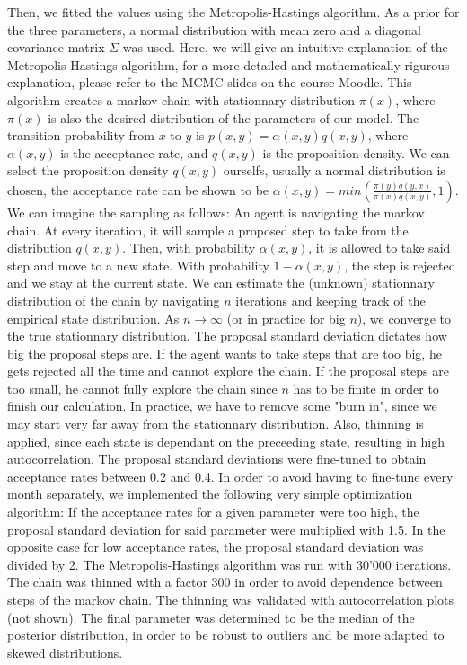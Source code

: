 \documentclass[10pt,conference,compsocconf]{IEEEtran}
\begin{document}
\par
Then, we fitted the values using the Metropolis-Hastings algorithm. As a prior for the three parameters, a normal distribution with mean zero and a diagonal covariance matrix $\Sigma$ was used.
Here, we will give an intuitive explanation of the Metropolis-Hastings algorithm, for a more detailed and mathematically rigurous explanation, please refer to the MCMC slides on the course Moodle.
This algorithm creates a markov chain with stationnary distribution $\pi(x)$, where $\pi(x)$ is also the desired distribution of the parameters of our model. The transition probability from $x$ to $y$ is $p(x,y)=\alpha(x,y) q(x,y)$, where $\alpha(x,y)$ is the acceptance rate, and $q(x,y)$ is the proposition density. We can select the proposition density $q(x,y)$ ourselfs, usually a normal distribution is chosen, the acceptance rate can be shown to be $\alpha(x,y)=min(\frac{\pi(y) q(y,x)}{\pi(x) q(x,y)},1)$.
We can imagine the sampling as follows:
An agent is navigating the markov chain. At every iteration, it will sample a proposed step to take from the distribution $q(x,y)$. Then, with probability $\alpha(x,y)$, it is allowed to take said step and move to a new state. With probability $1-\alpha(x,y)$, the step is rejected and we stay at the current state. We can estimate the (unknown) stationnary distribution of the chain by navigating $n$ iterations and keeping track of the empirical state distribution. As $n \to \infty$ (or in practice for big $n$), we converge to the true stationnary distribution. The proposal standard deviation dictates how big the proposal steps are. If the agent wants to take steps that are too big, he gets rejected all the time and cannot explore the chain. If the proposal steps are too small, he cannot fully explore the chain since $n$ has to be finite in order to finish our calculation. 
In practice, we have to remove some "burn in", since we may start very far away from the stationnary distribution. Also, thinning is applied, since each state is dependant on the preceeding state, resulting in high autocorrelation.
The proposal standard deviations were fine-tuned to obtain acceptance rates between 0.2 and 0.4. In order to avoid having to fine-tune every month separately, we implemented the following very simple optimization algorithm: If the acceptance rates for a given parameter were too high, the proposal standard deviation for said parameter were multiplied with 1.5. In the opposite case for low acceptance rates, the proposal standard deviation was divided by 2. The Metropolis-Hastings algorithm was run with 30'000 iterations. The chain was thinned with a factor 300 in order to avoid dependence between steps of the markov chain. The thinning was validated with autocorrelation plots (not shown). The final parameter was determined to be the median of the posterior distribution, in order to be robust to outliers and be more adapted to skewed distributions. 
\par
\end{document}
